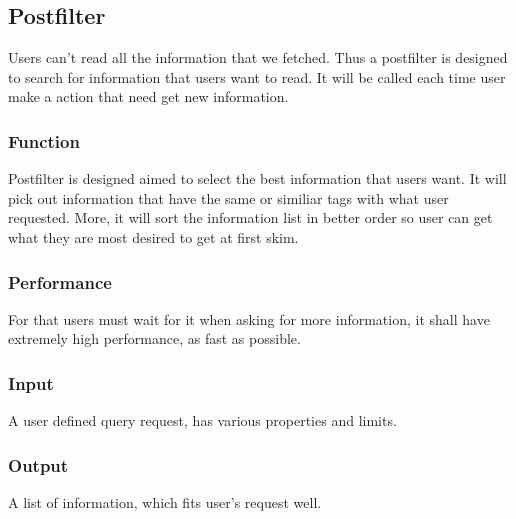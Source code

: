 
\subsection{Postfilter}
  Users can't read all the information that we fetched.
  Thus a postfilter is designed to search for information that users want to read.
  It will be called each time user make a action that need get new information.

  \subsubsection{Function}
    Postfilter is designed aimed to select the best information that users want.
    It will pick out information that have the same or similiar tags with what user requested.
    More, it will sort the information list in better order so user can get what they are most desired to get at first skim.

  \subsubsection{Performance}
    For that users must wait for it when asking for more information, it shall have extremely high performance, as fast as possible.

  \subsubsection{Input}
    A user defined query request, has various properties and limits.

  \subsubsection{Output}
    A list of information, which fits user's request well.

